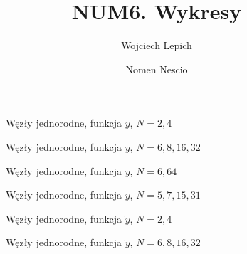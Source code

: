\documentclass[a4paper,11pt]{article}
\author{Wojciech Lepich \and Nomen Nescio}
\title{NUM6. Wykresy}
\begin{document}
\renewcommand*\listfigurename{Spis wykresów}
\maketitle
\listoffigures


\begin{figure}[h]
    \begin{center}
                
    \end{center}
    \caption{Węzły jednorodne, funkcja \(y\), \(N=2,4\)}
\end{figure}

\begin{figure}[h]
    \begin{center}
                
    \end{center}
    \caption{Węzły jednorodne, funkcja \(y\), \(N=6,8,16,32\)}
\end{figure}

\begin{figure}[h]
    \begin{center}
                
    \end{center}
    \caption{Węzły jednorodne, funkcja \(y\), \(N=6,64\)}
\end{figure}

\begin{figure}[h]
    \begin{center}
                
    \end{center}
    \caption{Węzły jednorodne, funkcja \(y\), \(N=5,7,15,31\)}
\end{figure}


\begin{figure}[h]
    \begin{center}
                
    \end{center}
    \caption{Węzły jednorodne, funkcja \(\tilde{y}\), \(N=2,4\)}
\end{figure}

\begin{figure}[h]
    \begin{center}
                
    \end{center}
    \caption{Węzły jednorodne, funkcja \(\tilde{y}\), \(N=6,8,16,32\)}
\end{figure}
\end{document}
